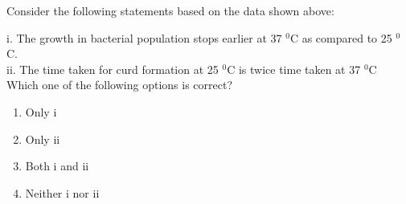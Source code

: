 \documentclass[journal,12pt,onecolumn]{IEEEtran}
\theoremstyle{remark}
\begin{document}
\begin{enumerate}
Consider the following statements based on the data shown above:

i. The growth in bacterial population stops earlier at 37 $^{0}$C as compared to 25 $^{0}$C.\\
ii. The time taken for curd formation at 25 $^{0}$C is twice time taken at 37 $^{0}$C
Which one of the following options is correct?
\begin{enumerate}
    \item Only i
    \item Only ii
    \item Both i and ii
    \item Neither i nor ii
\end{enumerate}
\end{enumerate}
\end{document}
